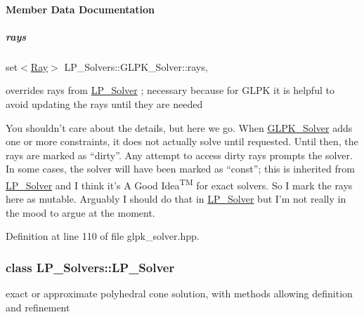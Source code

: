 \paragraph{Member Data Documentation}
\mbox{\label{group___c_l_s_solvers_ad748438e4625935b7c4ce4d677b2cdfd}} 
\subparagraph{\texorpdfstring{rays}{rays}}
{\footnotesize\ttfamily set$<$\hyperlink{group___c_l_s_solvers_class_l_p___solvers_1_1_ray}{Ray}$>$ L\+P\+\_\+\+Solvers\+::\+G\+L\+P\+K\+\_\+\+Solver\+::rays\hspace{0.3cm}{\ttfamily [mutable]}, {\ttfamily [protected]}}



overrides {\ttfamily rays} from {\ttfamily \hyperlink{group___c_l_s_solvers_class_l_p___solvers_1_1_l_p___solver}{L\+P\+\_\+\+Solver}} ; necessary because for G\+L\+PK it is helpful to avoid updating the rays until they are needed 

You shouldn't care about the details, but here we go. When {\ttfamily \hyperlink{group___c_l_s_solvers_class_l_p___solvers_1_1_g_l_p_k___solver}{G\+L\+P\+K\+\_\+\+Solver}} adds one or more constraints, it does not actually solve until requested. Until then, the rays are marked as ``dirty''. Any attempt to access dirty rays prompts the solver. In some cases, the solver will have been marked as ``const''; this is inherited from {\ttfamily \hyperlink{group___c_l_s_solvers_class_l_p___solvers_1_1_l_p___solver}{L\+P\+\_\+\+Solver}} and I think it's A Good Idea\textsuperscript{TM} for exact solvers. So I mark the rays here as {\ttfamily mutable}. Arguably I should do that in {\ttfamily \hyperlink{group___c_l_s_solvers_class_l_p___solvers_1_1_l_p___solver}{L\+P\+\_\+\+Solver}} but I'm not really in the mood to argue at the moment. 

Definition at line 110 of file glpk\+\_\+solver.\+hpp.

\label{class_l_p___solvers_1_1_l_p___solver}
\subsubsection{class L\+P\+\_\+\+Solvers\+:\+:L\+P\+\_\+\+Solver}
exact or approximate polyhedral cone solution, with methods allowing definition and refinement 

